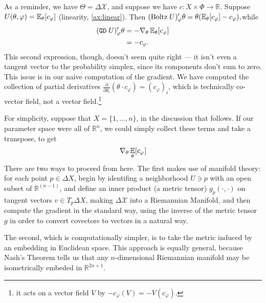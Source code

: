 \documentclass{uai2023}
\let\parencite\citep
\theoremstyle{plain}
\theoremstyle{definition}
\newcommand\X{\mathcal X}
\begin{document}
\begin{wip}
As a reminder, we have $\Theta = \Delta \X$, and suppose we have $c : X \times \Phi \to \mathbb R$.
	Suppose $U(\theta, \varphi) = \operatorname*{\mathbb{E}}_\theta[ c_\varphi ]$ (linearity, \cref{ax:linear}).
	Then
	$(\mathrm{Boltz}\;U)'_\varphi \theta = \theta(\operatorname*{\mathbb{E}}_\theta[c_\varphi] - c_\varphi),
	$while
	\begin{align*}
		 (\mathtt{GD}\; U)'_\varphi \theta &=
			 - \nabla_{\theta} \operatorname*{\mathbb{E}}\nolimits_\theta [ c_\varphi ]
			 \\ &= - c_\varphi
.
	\end{align*}
	This second expression, though, doesn't seem quite right --- it isn't even a tangent vector to the probability simplex, since its components don't sum to zero.
	This issue is in our naive computation of the gradient.
	We have computed the collection of partial derivatives $\frac{\partial}{\partial \theta_i} ( \theta \cdot  c_\varphi) = (c_\varphi)_i$,
	which is technically  co-vector field, not a vector field.\footnote{it acts on a vector field $V$ by $ -c_\varphi ( V ) = - V(c_\varphi)$.}

	For simplicity, suppose that $X = \{1, \ldots, n\}$, in the discussion that follows.
	If our parameter space were all of $\mathbb R^n$, we could simply collect these terms and take a transpose, to get
	\[
		\nabla_\theta \operatorname*{\mathbb{E}}_{\theta}[c_\varphi]
	\]
	There are two ways to proceed from here.
	The first makes use of manifold theory: for each point $p \in \Delta X$, begin by identifing a neighborhood $U \ni p$ with an open subset of $\mathbb R^{(n-1)}$, and define an inner product (a metric tensor) $g_p(\cdot, \cdot)$ on tangent vectors $v \in T_p\Delta X$, making $\Delta\X$ into a Riemannian Manifold, and then compute the gradient in the standard way, using the inverse of the metric tensor $g$ in order to convert covectors to vectors in a natural way.

The second, which is computationally simpler, is to take the metric induced by an embedding in Euclidean space.
	This approach is equally general, because Nash's Theorem \parencite{nash1956imbedding} tells us that any $n$-dimensional Riemannian manifold may be isometrically embeded in $\mathbb R^{2n+1}$.



\end{wip}
\end{document}
